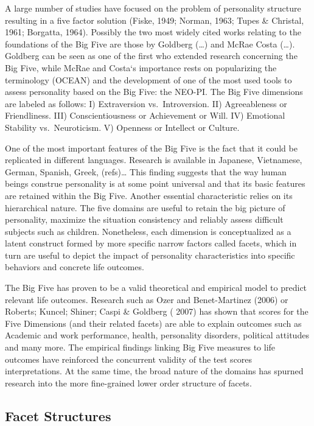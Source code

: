\documentclass[man]{apa6}
\theoremstyle{definition}
\theoremstyle{definition}
\theoremstyle{definition}
\theoremstyle{remark}
\begin{document}
A large number of studies have focused on the problem of personality
structure resulting in a five factor solution (Fiske, 1949; Norman,
1963; Tupes \& Christal, 1961; Borgatta, 1964). Possibly the two most
widely cited works relating to the foundations of the Big Five are those
by Goldberg (\ldots{}) and McRae Costa (\ldots{}). Goldberg can be seen
as one of the first who extended research concerning the Big Five, while
McRae and Costa`s importance rests on popularizing the terminology
(OCEAN) and the development of one of the most used tools to assess
personality based on the Big Five: the NEO-PI. The Big Five dimensions
are labeled as follows: I) Extraversion vs.~Introversion. II)
Agreeableness or Friendliness. III) Conscientiousness or Achievement or
Will. IV) Emotional Stability vs.~Neuroticism. V) Openness or Intellect
or Culture.

One of the most important features of the Big Five is the fact that it
could be replicated in different languages. Research is available in
Japanese, Vietnamese, German, Spanish, Greek, (refs)\ldots{} This
finding suggests that the way human beings construe personality is at
some point universal and that its basic features are retained within the
Big Five. Another essential characteristic relies on its hierarchical
nature. The five domains are useful to retain the big picture of
personality, maximize the situation consistency and reliably assess
difficult subjects such as children. Nonetheless, each dimension is
conceptualized as a latent construct formed by more specific narrow
factors called facets, which in turn are useful to depict the impact of
personality characteristics into specific behaviors and concrete life
outcomes.

The Big Five has proven to be a valid theoretical and empirical model to
predict relevant life outcomes. Research such as Ozer and Benet-Martinez
(2006) or Roberts; Kuncel; Shiner; Caspi \& Goldberg ( 2007) has shown
that scores for the Five Dimensions (and their related facets) are able
to explain outcomes such as Academic and work performance, health,
personality disorders, political attitudes and many more. The empirical
findings linking Big Five measures to life outcomes have reinforced the
concurrent validity of the test scores interpretations. At the same
time, the broad nature of the domains has spurned research into the more
fine-grained lower order structure of facets.

\hypertarget{facet-structures}{%
\subsection{Facet Structures}\label{facet-structures}}
\end{document}
